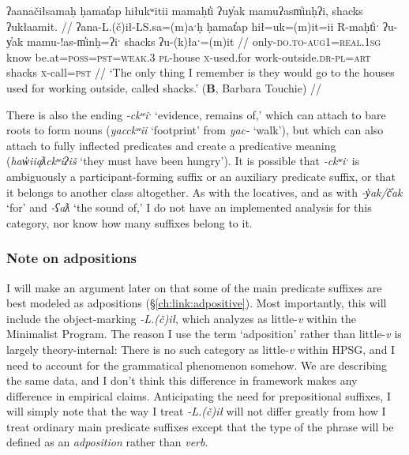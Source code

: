 \ex \label{ex:uyak}
\begingl
\glpreamble ʔaanačiłsamaḥ ḥamat̓ap hiłukʷitii mamaḥt̓i ʔuy̓ak mamuʔasm̓inḥʔi, shacks ʔukłaamit. //
\gla ʔana-L.(č)ił-LS.sa=(m)aˑḥ ḥamat̓ap hił=uk=(m)it=ii R-maḥt̓iˑ ʔu-y̓ak mamu-!as-m̓inḥ=ʔiˑ shacks ʔu-(k)łaˑ=(m)it //
\glb only-\textsc{do.to}-\textsc{aug1}=\textsc{real.1sg} know be.at=\textsc{poss}=\textsc{pst}=\textsc{weak.3} \textsc{pl}-house \textsc{x}-used.for work-outside.\textsc{dr}-\textsc{pl}=\textsc{art} shacks \textsc{x}-call=\textsc{pst} //
\glft `The only thing I remember is they would go to the houses used for working outside, called shacks.' (\textbf{B}, Barbara Touchie) //
\endgl
\xe

There is also the ending \textit{-ckʷiˑ} `evidence, remains of,' which can attach to bare roots to form nouns (\textit{yacckʷii} `footprint' from \textit{yac-} `walk'), but which can also attach to fully inflected predicates and create a predicative meaning (\textit{haw̓iiqƛckʷiʔiš} `they must have been hungry'). It is possible that \textit{-ckʷiˑ} is ambiguously a participant-forming suffix or an auxiliary predicate suffix, or that it belongs to another class altogether. As with the locatives, and as with \textit{-y̓ak/č̓ak} `for' and \textit{-ʕaƛ} `the sound of,' I do not have an implemented analysis for this category, nor know how many suffixes belong to it.

\subsubsection{Note on adpositions} \label{ch:clause:2pv:adp}

I will make an argument later on that some of the main predicate suffixes are best modeled as adpositions (\S\ref{ch:link:adpositive}). Most importantly, this will include the object-marking \textit{-L.(č)ił}, which \cite{woo2007b} analyzes as little-\textit{v} within the Minimalist Program. The reason I use the term `adposition' rather than little-\textit{v} is largely theory-internal: There is no such category as little-\textit{v} within HPSG, and I need to account for the grammatical phenomenon somehow. We are describing the same data, and I don't think this difference in framework makes any difference in empirical claims. Anticipating the need for prepositional suffixes, I will simply note that the way I treat \textit{-L.(č)ił} will not differ greatly from how I treat ordinary main predicate suffixes except that the type of the phrase will be defined as an \textit{adposition} rather than \textit{verb}.

